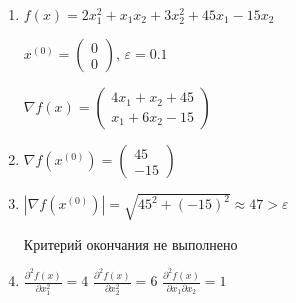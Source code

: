 \documentclass{article}
\begin{document}
\begin{enumerate}
    \item
        $f(x) = 2x_1^2 + x_1x_2 + 3x_2^2 + 45x_1 - 15x_2$
        
        $x^{(0)} = \begin{pmatrix} 0 \\ 0 \end{pmatrix}$, 
        $\varepsilon = 0.1$
        
        $\nabla f(x) =
        \begin{pmatrix}
            4x_1 + x_2 + 45 \\
            x_1 + 6x_2 - 15
        \end{pmatrix}$
    \item $\nabla f(x^{(0)}) =
    \begin{pmatrix}
        45 \\
        -15
    \end{pmatrix}$
    \item $\left| \nabla f(x^{(0)}) \right| = \sqrt{45^2 + (-15)^2} \approx 47 > \varepsilon$
    
    Критерий окончания не выполнено
    \item $\frac{\partial ^2 f(x)}{\partial x_1^2} = 4$ 
        $\frac{\partial ^2 f(x)}{\partial x_2^2} = 6$
        $\frac{\partial ^2 f(x)}{\partial x_1 \partial x_2} = 1$


\end{enumerate}
\end{document}
